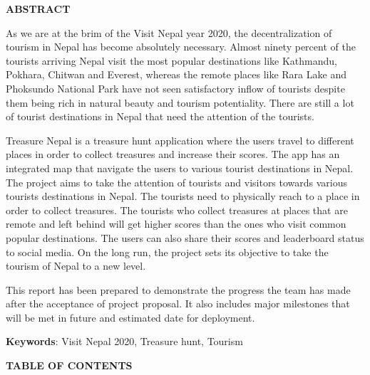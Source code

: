 \documentclass[12pt, a4paper, oneside]{article}
\begin{document}
\large
\begin{center}
	\textbf{ABSTRACT}
\end{center}

\normalsize
As we are at the brim of the Visit Nepal year 2020, the decentralization of tourism in Nepal has become absolutely necessary. Almost ninety percent of the tourists arriving Nepal visit the most popular destinations like Kathmandu, Pokhara, Chitwan and Everest, whereas the remote places like Rara Lake and Phoksundo National Park have not seen satisfactory inflow of tourists despite them being rich in natural beauty and tourism potentiality. There are still a lot of tourist destinations in Nepal that need the attention of the tourists.

Treasure Nepal is a treasure hunt application where the users travel to different places in order to collect treasures and increase their scores. The app has an integrated map that navigate the users to various tourist destinations in Nepal. The project aims to take the attention of tourists and visitors towards various tourists destinations in Nepal. The tourists need to physically reach to a place in order to collect treasures. The tourists who collect treasures at places that are remote and left behind will get higher scores than the ones who visit common popular destinations. The users can also share their scores and leaderboard status to social media. On the long run, the project sets its objective to take the tourism of Nepal to a new level.

This report has been prepared to demonstrate the progress the team has made after the acceptance of project proposal. It also includes major milestones that will be met in future and estimated date for deployment.

\textbf{Keywords}: Visit Nepal 2020, Treasure hunt, Tourism\\

\break

\large
{}
\begin{center}
	\textbf{TABLE OF CONTENTS}
\end{center}


\normalsize
\setlength{\cftbeforetoctitleskip}{0pt}
\renewcommand{\contentsname}{}
\tableofcontents

\break

\cfoot{\textbf{\thepage} /  \pageref{LastPage}}
\end{document}
